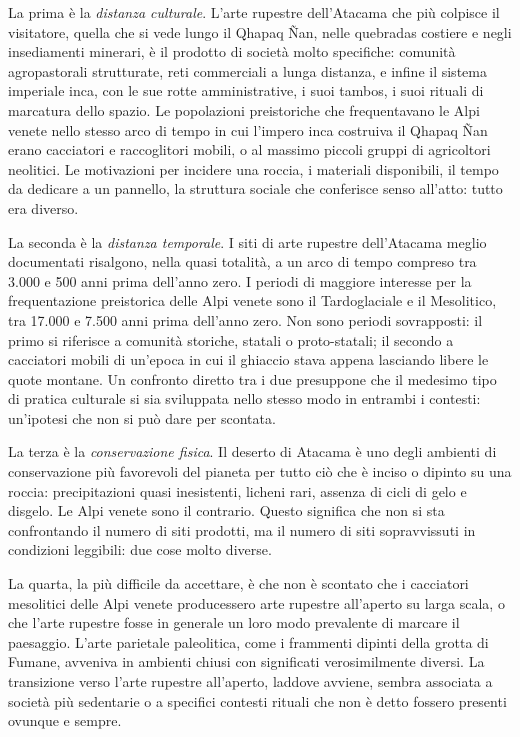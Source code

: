La prima è la \emph{distanza culturale}. L'arte rupestre dell'Atacama che più colpisce il visitatore, quella che si vede lungo il Qhapaq Ñan, nelle quebradas costiere e negli insediamenti minerari, è il prodotto di società molto specifiche: comunità agropastorali strutturate, reti commerciali a lunga distanza, e infine il sistema imperiale inca, con le sue rotte amministrative, i suoi tambos, i suoi rituali di marcatura dello spazio. Le popolazioni preistoriche che frequentavano le Alpi venete nello stesso arco di tempo in cui l'impero inca costruiva il Qhapaq Ñan erano cacciatori e raccoglitori mobili, o al massimo piccoli gruppi di agricoltori neolitici. Le motivazioni per incidere una roccia, i materiali disponibili, il tempo da dedicare a un pannello, la struttura sociale che conferisce senso all'atto: tutto era diverso.

La seconda è la \emph{distanza temporale}. I siti di arte rupestre dell'Atacama meglio documentati risalgono, nella quasi totalità, a un arco di tempo compreso tra 3.000 e 500 anni prima dell'anno zero. I periodi di maggiore interesse per la frequentazione preistorica delle Alpi venete sono il Tardoglaciale e il Mesolitico, tra 17.000 e 7.500 anni prima dell'anno zero. Non sono periodi sovrapposti: il primo si riferisce a comunità storiche, statali o proto-statali; il secondo a cacciatori mobili di un'epoca in cui il ghiaccio stava appena lasciando libere le quote montane. Un confronto diretto tra i due presuppone che il medesimo tipo di pratica culturale si sia sviluppata nello stesso modo in entrambi i contesti: un'ipotesi che non si può dare per scontata.

La terza è la \emph{conservazione fisica}. Il deserto di Atacama è uno degli ambienti di conservazione più favorevoli del pianeta per tutto ciò che è inciso o dipinto su una roccia: precipitazioni quasi inesistenti, licheni rari, assenza di cicli di gelo e disgelo. Le Alpi venete sono il contrario. Questo significa che non si sta confrontando il numero di siti prodotti, ma il numero di siti sopravvissuti in condizioni leggibili: due cose molto diverse.

La quarta, la più difficile da accettare, è che non è scontato che i cacciatori mesolitici delle Alpi venete producessero arte rupestre all'aperto su larga scala, o che l'arte rupestre fosse in generale un loro modo prevalente di marcare il paesaggio. L'arte parietale paleolitica, come i frammenti dipinti della grotta di Fumane, avveniva in ambienti chiusi con significati verosimilmente diversi. La transizione verso l'arte rupestre all'aperto, laddove avviene, sembra associata a società più sedentarie o a specifici contesti rituali che non è detto fossero presenti ovunque e sempre.

